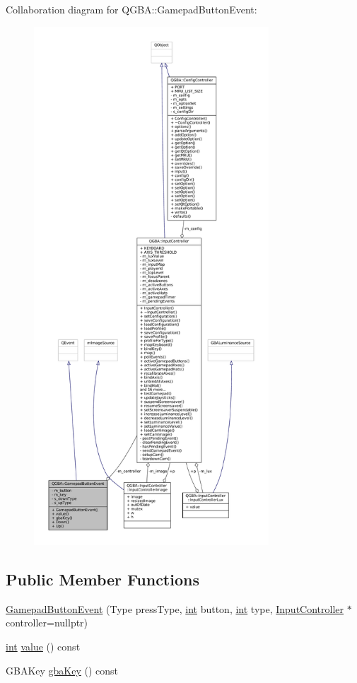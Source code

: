 Collaboration diagram for Q\+G\+BA\+:\+:Gamepad\+Button\+Event\+:
\nopagebreak
\begin{figure}[H]
\begin{center}
\leavevmode
\includegraphics[height=550pt]{class_q_g_b_a_1_1_gamepad_button_event__coll__graph}
\end{center}
\end{figure}
\subsection*{Public Member Functions}
\begin{DoxyCompactItemize}
\item 
\mbox{\hyperlink{class_q_g_b_a_1_1_gamepad_button_event_a5bc5f573023d767128bea16fc9284d41}{Gamepad\+Button\+Event}} (Type press\+Type, \mbox{\hyperlink{ioapi_8h_a787fa3cf048117ba7123753c1e74fcd6}{int}} button, \mbox{\hyperlink{ioapi_8h_a787fa3cf048117ba7123753c1e74fcd6}{int}} type, \mbox{\hyperlink{class_q_g_b_a_1_1_input_controller}{Input\+Controller}} $\ast$controller=nullptr)
\item 
\mbox{\hyperlink{ioapi_8h_a787fa3cf048117ba7123753c1e74fcd6}{int}} \mbox{\hyperlink{class_q_g_b_a_1_1_gamepad_button_event_a4369eaa63562f97f264c45463b3d9a18}{value}} () const
\item 
G\+B\+A\+Key \mbox{\hyperlink{class_q_g_b_a_1_1_gamepad_button_event_a43e724ddf53e2558bd1ea44559dd7e78}{gba\+Key}} () const
\end{DoxyCompactItemize}
